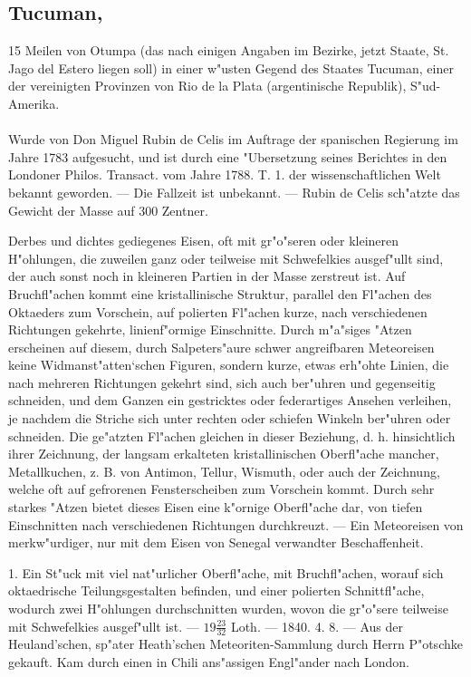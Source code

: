 \documentclass[a4paper, 11pt, oneside, polutonikogreek, german]{article}
\begin{document}
\subsection[Tucuman.]{Tucuman,}
\begin{center}
\small
15 Meilen von Otumpa (das nach einigen Angaben im Bezirke, jetzt Staate, St. Jago del Estero liegen soll) in einer w"usten Gegend des Staates Tucuman, einer der vereinigten Provinzen von Rio de la Plata (argentinische Republik), S"ud-Amerika.
\end{center}
\paragraph{}
Wurde von Don Miguel Rubin de Celis im Auftrage der spanischen Regierung im Jahre 1783 aufgesucht, und ist durch eine "Ubersetzung seines Berichtes in den Londoner Philos. Transact. vom Jahre 1788. T. 1. der wissenschaftlichen Welt bekannt geworden. --- Die Fallzeit ist unbekannt. --- Rubin de Celis sch"atzte das Gewicht der Masse auf 300 Zentner.

Derbes und dichtes gediegenes Eisen, oft mit gr"o"seren oder kleineren H"ohlungen, die zuweilen ganz oder teilweise mit Schwefelkies ausgef"ullt sind, der auch sonst noch in kleineren Partien in der Masse zerstreut ist. Auf Bruchfl"achen kommt eine kristallinische Struktur, parallel den Fl"achen des Oktaeders zum Vorschein, auf polierten Fl"achen kurze, nach verschiedenen Richtungen gekehrte, linienf"ormige Einschnitte. Durch m"a"siges "Atzen erscheinen auf diesem, durch Salpeters"aure schwer angreifbaren Meteoreisen keine Widmanst"atten‘schen Figuren, sondern kurze, etwas erh"ohte Linien, die nach mehreren Richtungen gekehrt sind, sich auch ber"uhren und gegenseitig schneiden, und dem Ganzen ein gestricktes oder federartiges Ansehen verleihen, je nachdem die Striche sich unter rechten oder schiefen Winkeln ber"uhren oder schneiden. Die ge"atzten Fl"achen gleichen in dieser Beziehung, d. h. hinsichtlich ihrer Zeichnung, der langsam erkalteten kristallinischen Oberfl"ache mancher, Metallkuchen, z. B. von Antimon, Tellur, Wismuth, oder auch der Zeichnung, welche oft auf gefrorenen Fensterscheiben zum Vorschein kommt. Durch sehr starkes "Atzen bietet dieses Eisen eine k"ornige Oberfl"ache dar, von tiefen Einschnitten nach verschiedenen Richtungen durchkreuzt. --- Ein Meteoreisen von merkw"urdiger, nur mit dem Eisen von Senegal verwandter Beschaffenheit.

1. Ein St"uck mit viel nat"urlicher Oberfl"ache, mit Bruchfl"achen, worauf sich oktaedrische Teilungsgestalten befinden, und einer polierten Schnittfl"ache, wodurch zwei H"ohlungen durchschnitten wurden, wovon die gr"o"sere teilweise mit Schwefelkies ausgef"ullt ist. --- $19\frac{23}{32}$ Loth. --- 1840. 4. 8. --- Aus der Heuland'schen, sp"ater Heath'schen Meteoriten-Sammlung durch Herrn P"otschke gekauft. Kam durch einen in Chili ans"assigen Engl"ander nach London.
\end{document}

